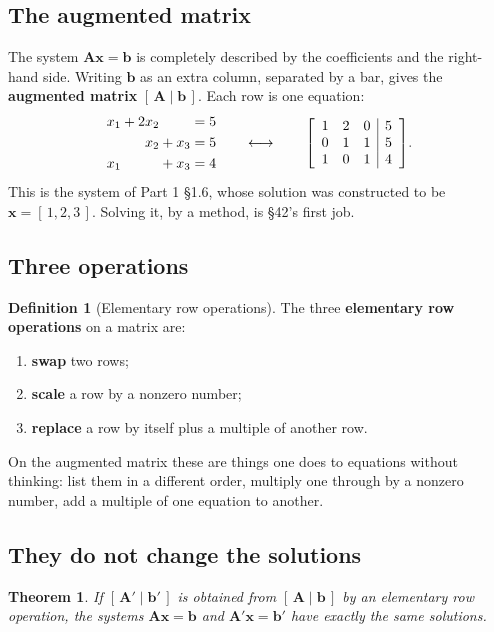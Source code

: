 \documentclass[11pt]{article}
\theoremstyle{plain}
\newtheorem{thm}{Theorem}[section]
\theoremstyle{definition}
\newtheorem{defn}{Definition}[section]
\theoremstyle{remark}
\newcommand{\vc}[1]{\mathbf{#1}}
\newcommand{\mt}[1]{\mathbf{#1}}
\newenvironment{aug}[1]{\left[\begin{array}{#1}}{\end{array}\right]}
\begin{document}
\subsection{The augmented matrix}
The system $\mt{A}\vc{x}=\vc{b}$ is completely described by the coefficients and
the right-hand side. Writing $\vc{b}$ as an extra column, separated by a bar, gives
the \textbf{augmented matrix} $[\,\mt{A}\mid\vc{b}\,]$. Each row is one equation:
\[
  \begin{aligned}
    x_1+2x_2\phantom{{}+x_3}&=5\\
    x_2+x_3&=5\\
    x_1\phantom{{}+2x_2}+x_3&=4
  \end{aligned}
  \qquad\longleftrightarrow\qquad
  \begin{aug}{ccc|c}1&2&0&5\\0&1&1&5\\1&0&1&4\end{aug}.
\]
This is the system of Part 1 \S1.6, whose solution was constructed to be
$\vc{x}=[\,1,2,3\,]$. Solving it, by a method, is \S42's first job.

\subsection{Three operations}
\begin{defn}[Elementary row operations]
The three \textbf{elementary row operations} on a matrix are:
\begin{enumerate}[label=\textbf{(E\arabic*)},leftmargin=3em,itemsep=2pt]
  \item \textbf{swap} two rows;
  \item \textbf{scale} a row by a nonzero number;
  \item \textbf{replace} a row by itself plus a multiple of another row.
\end{enumerate}
\end{defn}

\noindent On the augmented matrix these are things one does to equations without
thinking: list them in a different order, multiply one through by a nonzero
number, add a multiple of one equation to another.

\subsection{They do not change the solutions}
\begin{thm}
\label{thm:rowops}
If $[\,\mt{A}'\mid\vc{b}'\,]$ is obtained from $[\,\mt{A}\mid\vc{b}\,]$ by an
elementary row operation, the systems $\mt{A}\vc{x}=\vc{b}$ and
$\mt{A}'\vc{x}=\vc{b}'$ have exactly the same solutions.
\end{thm}
\end{document}
